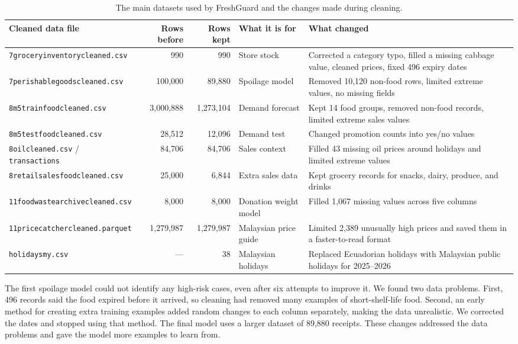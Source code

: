 \documentclass[12pt,a4paper]{article}
\renewcommand{\_}{\oldunderscore\allowbreak}
\begin{document}
\begin{table}[H]
\centering
\caption{The main datasets used by FreshGuard and the changes made during cleaning.}
\label{tab:datasets}
\renewcommand{\arraystretch}{1.15}
{\scriptsize
\begin{tabularx}{\textwidth}{@{} l r r l >{\raggedright\arraybackslash}X @{}}
\toprule
\rowcolor{NavyPrimary}
\color{white}\textbf{Cleaned data file} & \color{white}\textbf{Rows before} & \color{white}\textbf{Rows kept} & \color{white}\textbf{What it is for} & \color{white}\textbf{What changed} \\
\midrule
\texttt{7\_grocery\_inventory\_cleaned.csv} & 990 & 990 & Store stock & Corrected a category typo, filled a missing cabbage value, cleaned prices, fixed 496 expiry dates \\
\rowcolor{LightBg}
\texttt{7\_perishable\_goods\_cleaned.csv} & 100,000 & 89,880 & Spoilage model & Removed 10,120 non-food rows, limited extreme values, no missing fields \\
\texttt{8\_m5\_train\_food\_cleaned.csv} & 3,000,888 & 1,273,104 & Demand forecast & Kept 14 food groups, removed non-food records, limited extreme sales values \\
\rowcolor{LightBg}
\texttt{8\_m5\_test\_food\_cleaned.csv} & 28,512 & 12,096 & Demand test & Changed promotion counts into yes/no values \\
\texttt{8\_oil\_cleaned.csv} / \texttt{transactions} & 84,706 & 84,706 & Sales context & Filled 43 missing oil prices around holidays and limited extreme values \\
\rowcolor{LightBg}
\texttt{8\_retail\_sales\_food\_cleaned.csv} & 25,000 & 6,844 & Extra sales data & Kept grocery records for snacks, dairy, produce, and drinks \\
\texttt{11\_food\_waste\_archive\_cleaned.csv} & 8,000 & 8,000 & Donation weight model & Filled 1,067 missing values across five columns \\
\rowcolor{LightBg}
\texttt{11\_pricecatcher\_cleaned.parquet} & 1,279,987 & 1,279,987 & Malaysian price guide & Limited 2,389 unusually high prices and saved them in a faster-to-read format \\
\texttt{holidays\_my.csv} & --- & 38 & Malaysian holidays & Replaced Ecuadorian holidays with Malaysian public holidays for 2025--2026 \\
\bottomrule
\end{tabularx}}
\end{table}

\begin{keyfinding}
The first spoilage model could not identify any high-risk cases, even after six attempts to improve it. We found two data problems. First, 496 records said the food expired before it arrived, so cleaning had removed many examples of short-shelf-life food. Second, an early method for creating extra training examples added random changes to each column separately, making the data unrealistic. We corrected the dates and stopped using that method. The final model uses a larger dataset of 89,880 receipts. These changes addressed the data problems and gave the model more examples to learn from.
\end{keyfinding}
\end{document}
